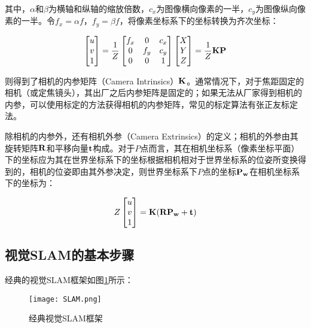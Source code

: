 其中，$\alpha$和$\beta$为横轴和纵轴的缩放倍数，$c_x$为图像横向像素的一半，$c_y$为图像纵向像素的一半。令$f_x=\alpha f$，$f_y=\beta f$，将像素坐标系下的坐标转换为齐次坐标：

$$
\begin{bmatrix}
u\\v\\1
\end{bmatrix}=
\frac{1}{Z}
\begin{bmatrix}
f_x & 0 & c_x\\
0   & f_y & c_y\\
0 & 0 & 1
\end{bmatrix}
\begin{bmatrix}
X\\Y\\Z
\end{bmatrix}=
\frac{1}{Z} \bf{KP}
$$

则得到了相机的内参矩阵（Camera Intrinsics）$\bf{K}$。通常情况下，对于焦距固定的相机（或定焦镜头），其出厂之后内参矩阵是固定的；如果无法从厂家得到相机的内参，可以使用标定的方法获得相机的内参矩阵，常见的标定算法有张正友标定法。

除相机的内参外，还有相机外参（Camera Extrinsics）的定义；相机的外参由其旋转矩阵$\bf{R}$和平移向量$\bf{t}$构成。对于$P$点而言，其在相机坐标系（像素坐标平面）下的坐标应为其在世界坐标系下的坐标根据相机相对于世界坐标系的位姿所变换得到的，相机的位姿即由其外参决定，则世界坐标系下$P$点的坐标$\bf{P_w}$在相机坐标系下的坐标为：

$$
Z
\begin{bmatrix}
u\\v\\1
\end{bmatrix}=
\bf{K(RP_w+t)}
$$

\subsection{视觉SLAM的基本步骤} \label{3.1.3}

经典的视觉SLAM框架如图\ref{fig5}所示：

\begin{figure}[!ht]
	\centering
	\texttt{[image: SLAM.png]}
	\caption{经典视觉SLAM框架} 
	\label{fig5}
\end{figure}

